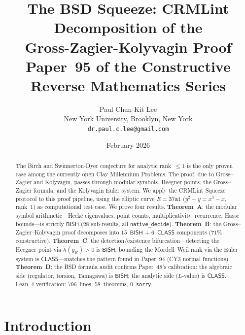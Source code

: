 \documentclass[11pt]{article}
\theoremstyle{plain}
\theoremstyle{definition}
\theoremstyle{remark}
\newcommand{\BISH}{\ensuremath{\mathsf{BISH}}}
\newcommand{\CLASS}{\ensuremath{\mathsf{CLASS}}}
\newcommand{\hhat}{\hat{h}}
\begin{document}
\title{The BSD Squeeze: CRMLint Decomposition of the\\
Gross-Zagier-Kolyvagin Proof\\[6pt]
\large Paper~95 of the Constructive Reverse Mathematics Series}

\author{Paul Chun-Kit Lee\\
\small New York University, Brooklyn, New York\\
\small \texttt{dr.paul.c.lee@gmail.com}}

\date{February 2026}

\maketitle

\begin{abstract}
The Birch and Swinnerton-Dyer conjecture for analytic rank~$\leq 1$ is the only proven case among the currently open Clay Millennium Problems. The proof, due to Gross--Zagier and Kolyvagin, passes through modular symbols, Heegner points, the Gross--Zagier formula, and the Kolyvagin Euler system. We apply the CRMLint Squeeze protocol to this proof pipeline, using the elliptic curve $E = \texttt{37a1}$ ($y^2 + y = x^3 - x$, rank~$1$) as computational test case. We prove four results. \textbf{Theorem~A}: the modular symbol arithmetic---Hecke eigenvalues, point counts, multiplicativity, recurrence, Hasse bounds---is strictly $\BISH$ (28 sub-results, all \texttt{native\_decide}). \textbf{Theorem~B}: the Gross--Zagier--Kolyvagin proof decomposes into $15$~$\BISH$ + $6$~$\CLASS$ components ($71\%$ constructive). \textbf{Theorem~C}: the detection/existence bifurcation---detecting the Heegner point via $\hhat(y_K) > 0$ is $\BISH$; bounding the Mordell--Weil rank via the Euler system is $\CLASS$---matches the pattern found in Paper~94 (CY3 normal functions). \textbf{Theorem~D}: the BSD formula audit confirms Paper~48's calibration: the algebraic side (regulator, torsion, Tamagawa) is $\BISH$; the analytic side ($L$-value) is $\CLASS$. Lean~4 verification: 796~lines, 58~theorems, 0~\texttt{sorry}.
\end{abstract}

\section{Introduction}
\label{sec:intro}
\end{document}
